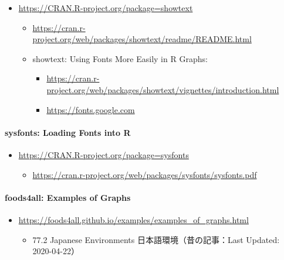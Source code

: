 \documentclass[
]{bxjsbook}
\providecommand{\tightlist}{%
  \setlength{\itemsep}{0pt}\setlength{\parskip}{0pt}}
\theoremstyle{definition}
\theoremstyle{definition}
\theoremstyle{definition}
\theoremstyle{definition}
\theoremstyle{remark}
\begin{document}
\begin{itemize}
\tightlist
\item
  \url{https://CRAN.R-project.org/package=showtext}

  \begin{itemize}
  \tightlist
  \item
    \url{https://cran.r-project.org/web/packages/showtext/readme/README.html}
  \item
    showtext: Using Fonts More Easily in R Graphs:

    \begin{itemize}
    \tightlist
    \item
      \url{https://cran.r-project.org/web/packages/showtext/vignettes/introduction.html}
    \item
      \url{https://fonts.google.com}
    \end{itemize}
  \end{itemize}
\end{itemize}

\hypertarget{sysfonts-loading-fonts-into-r}{%
\paragraph{sysfonts: Loading Fonts into R}\label{sysfonts-loading-fonts-into-r}}

\begin{itemize}
\tightlist
\item
  \url{https://CRAN.R-project.org/package=sysfonts}

  \begin{itemize}
  \tightlist
  \item
    \url{https://cran.r-project.org/web/packages/sysfonts/sysfonts.pdf}
  \end{itemize}
\end{itemize}

\hypertarget{foods4all-examples-of-graphs}{%
\paragraph{foods4all: Examples of Graphs}\label{foods4all-examples-of-graphs}}

\begin{itemize}
\tightlist
\item
  \url{https://foods4all.github.io/examples/examples_of_graphs.html}

  \begin{itemize}
  \tightlist
  \item
    77.2 Japanese Environments 日本語環境（昔の記事：Last Updated: 2020-04-22）
  \end{itemize}
\end{itemize}
\end{document}
